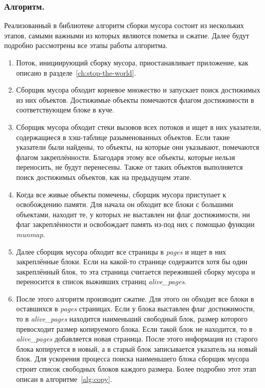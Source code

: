 \subsubsection{Алгоритм.}
Реализованный в библиотеке алгоритм сборки мусора состоит из нескольких этапов, самыми важными из которых являются пометка и сжатие. Далее будут подробно рассмотрены все этапы работы алгоритма.
\begin{enumerate}
\item Поток, инициирующий сборку мусора, приостанавливает приложение, как описано в разделе~\ref{ch:stop-the-world}.
\item Сборщик мусора обходит корневое множество и запускает поиск достижимых из них объектов. Достижимые объекты помечаются флагом достижимости в соответствующем блоке в куче.
\item Сборщик мусора обходит стеки вызовов всех потоков и ищет в них указатели, содержащиеся в  хэш-таблице разыменованных объектов. Если такие указатели были найдены, то объекты, на которые они указывают, помечаются флагом закреплённости.
Благодаря этому все объекты, которые нельзя переносить, не будут перенесены. Также от таких объектов выполняется поиск достижимых объектов, как на предыдущем этапе. \label{step:deref}
\item Когда все живые объекты помечены, сборщик мусора приступает к освобождению памяти. Для начала он обходит все блоки с большими объектами, находит те, у которых не выставлен ни флаг достижимости, ни флаг закреплённости и освобождает память из-под них с помощью функции \textit{munmap}.
\item Далее сборщик мусора обходит все страницы в \textit{pages} и ищет в них закреплённые блоки. Если на какой-то странице содержится хотя бы один закреплённый блок, то эта страница считается пережившей сборку мусора и переносится в список выживших страниц \textit{alive\_pages}.
\item После этого алгоритм производит сжатие. Для этого он обходит все блоки в оставшихся в \textit{pages} страницах. Если у блока выставлен флаг достижимости, то в \textit{alive\_pages} находится наименьший свободный блок, размер которого превосходит размер копируемого блока. Если такой блок не находится, то в \textit{alive\_pages} добавляется новая страница. После этого информация из старого блока копируется в новый, а в старый блок записывается указатель на новый блок. Для ускорения процесса поиска наименьшего блока сборщик мусора строит список свободных блоков каждого размера. Более подробно этот этап описан в алгоритме~\ref{alg:copy}.

\end{enumerate}
